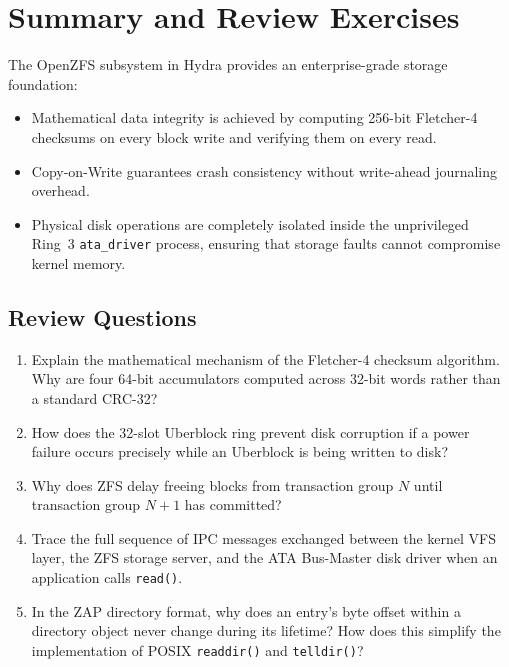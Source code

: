 \section{Summary and Review Exercises}
\label{sec:storage_source_exercises}

The OpenZFS subsystem in Hydra provides an enterprise-grade storage foundation:
\begin{itemize}
    \item Mathematical data integrity is achieved by computing 256-bit Fletcher-4 checksums on every block write and verifying them on every read.
    \item Copy-on-Write guarantees crash consistency without write-ahead journaling overhead.
    \item Physical disk operations are completely isolated inside the unprivileged Ring~3 \texttt{ata\_driver} process, ensuring that storage faults cannot compromise kernel memory.
\end{itemize}

\subsection*{Review Questions}
\begin{enumerate}
    \item Explain the mathematical mechanism of the Fletcher-4 checksum algorithm. Why are four 64-bit accumulators computed across 32-bit words rather than a standard CRC-32?
    \item How does the 32-slot Uberblock ring prevent disk corruption if a power failure occurs precisely while an Uberblock is being written to disk?
    \item Why does ZFS delay freeing blocks from transaction group $N$ until transaction group $N+1$ has committed?
    \item Trace the full sequence of IPC messages exchanged between the kernel VFS layer, the ZFS storage server, and the ATA Bus-Master disk driver when an application calls \texttt{read()}.
    \item In the ZAP directory format, why does an entry's byte offset within a directory object never change during its lifetime? How does this simplify the implementation of POSIX \texttt{readdir()} and \texttt{telldir()}?
\end{enumerate}
